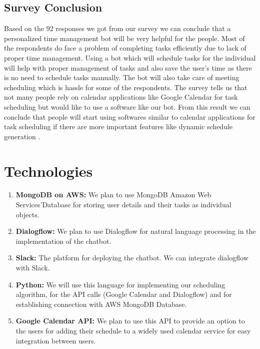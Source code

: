 \documentclass{sig-alternate-05-2015}
\begin{document}
\subsection*{Survey Conclusion}
\par
Based on the 92 responses we got from our survey we can conclude that a personalized time management bot will be very helpful for the people. Most of the respondents do face a problem of completing tasks efficiently due to lack of proper time management. Using a bot which will schedule tasks for the individual will help with proper management of tasks and also save the user's time as there is no need to schedule tasks manually. The bot will also take care of meeting scheduling which is hassle for some of the respondents. The survey tells us that not many people rely on calendar applications like Google Calendar for task scheduling but would like to use a software like our bot. From this result we can conclude that people will start using softwares similar to calendar applications for task scheduling if there are more important features like dynamic schedule generation . 


\section{Technologies}
\begin{enumerate}
  \item \textbf{MongoDB on AWS: } 
  We plan to use MongoDB\cite{planner5} Amazon Web Services'Database\cite{planner6} for storing user details and their tasks as individual objects.
  \item \textbf{Dialogflow: } 
  We plan to use Dialogflow\cite{planner7} for natural language processing in the implementation of the chatbot.
  \item \textbf{Slack: } 
  The platform for deploying the chatbot. We can integrate dialogflow with Slack\cite{planner8}.
  \item \textbf{Python: } 
  We will use this language for implementing our scheduling algorithm, for the API calls (Google Calendar and Dialogflow) and for establishing connection with AWS MongoDB Database.
  \item \textbf{Google Calendar API: } 
  We plan to use this API to provide an option to the users for adding their schedule to a widely used calendar service for easy integration between users.
\end{enumerate}
\end{document}
